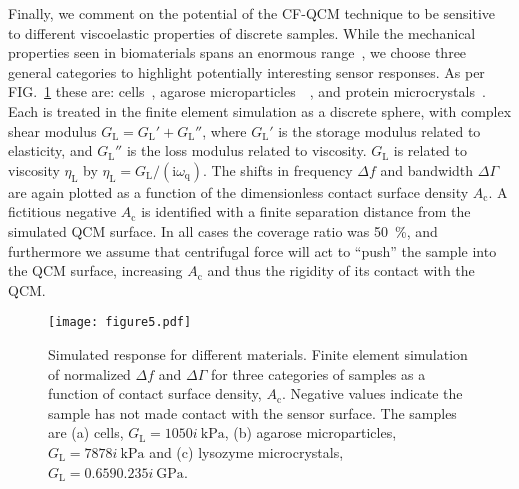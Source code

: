 \documentclass[floatfix,superscriptaddress,a4paper,twocolumn]{revtex4-1}
\newcommand{\Figure}[1]{FIG.~\ref{#1}}
\newcommand{\mi}{{\mathrm{i}}}
\newcommand{\df}{\Delta\!f}
\newcommand{\dg}{\Delta\Gamma}
\newcommand{\omegaq}{\omega_\mathrm{q}}
\begin{document}
Finally, we comment on the potential of the CF-QCM technique to be
sensitive to different viscoelastic properties of discrete samples.  While
the mechanical properties seen in biomaterials spans an enormous
range~\cite{meyers2008biological}, we choose three general categories to
highlight potentially interesting sensor responses.  As per
\Figure{fig:multisweep} these are: cells~\cite{li2008thickness}, agarose
microparticles~\cite{li2011surface}~\cite{patra2009viscoelastic}, and
protein microcrystals~\cite{zamiri2009modeling}.  Each is treated in the
finite element simulation as a discrete sphere, with complex shear modulus
$G_\mathrm{L}=G_\mathrm{L}'+G_\mathrm{L}''$, where $G_\mathrm{L}'$ is the
storage modulus related to elasticity, and $G_\mathrm{L}''$ is the loss
modulus related to viscosity.  $G_\mathrm{L}$ is related to viscosity
$\eta_\mathrm{L}$ by $\eta_\mathrm{L}=G_\mathrm{L}/(\mi\omegaq)$.  The
shifts in frequency $\df$ and bandwidth $\dg$ are again plotted as a function of
the dimensionless contact surface density $A_\mathrm{c}$.
A fictitious negative $A_\mathrm{c}$
is identified with a finite separation distance from the
simulated QCM surface.  In all cases the coverage ratio was
\SI{50}{\percent}, and furthermore we assume that centrifugal force will act to
``push'' the sample into the QCM surface, increasing $A_\mathrm{c}$ and
thus the rigidity of its contact with the QCM.
\begin{figure}[ht]
 \centering
\texttt{[image: figure5.pdf]}
\caption{Simulated response for different materials.  Finite element simulation of normalized $\df$ and $\dg$ for three
 categories of samples as a function of contact surface density, 
 $A_\mathrm{c}$.
 Negative values indicate the sample has not made contact with the sensor
 surface.
 The samples are (a) cells, $G_\mathrm{L}=\SI{10+50i}{\kilo\pascal}$, (b)
 agarose microparticles, $G_\mathrm{L}=\SI{78+78i}{\kilo\pascal}$ and (c) lysozyme
 microcrystals, $G_\mathrm{L}=\SI{0.659+0.235i}{\giga\pascal}$.  }
\label{fig:multisweep}
\end{figure}
\end{document}

